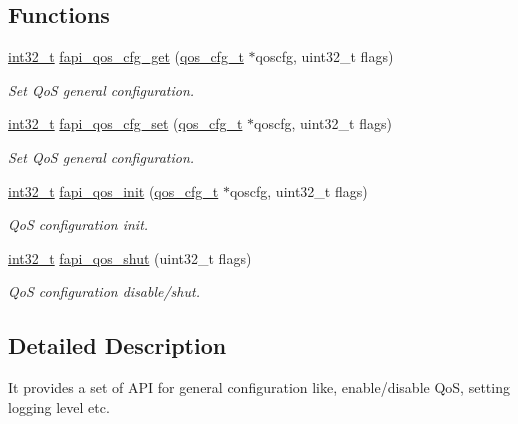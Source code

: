 \subsection*{Functions}
\begin{DoxyCompactItemize}
\item 
\hyperlink{commondefs_8h_a32f2e37ee053cf2ce8ca28d1f74630e5}{int32\-\_\-t} \hyperlink{group__FAPI__QOS__GENERAL_gafd940d9821b55eebebc562898643af6b}{fapi\-\_\-qos\-\_\-cfg\-\_\-get} (\hyperlink{group__FAPI__QOS__GENERAL_gabfc98fb0c7c5226badf1eb79b4ab6e2b}{qos\-\_\-cfg\-\_\-t} $\ast$qoscfg, uint32\-\_\-t flags)
\begin{DoxyCompactList}\small\item\em Set Qo\-S general configuration. \end{DoxyCompactList}\item 
\hyperlink{commondefs_8h_a32f2e37ee053cf2ce8ca28d1f74630e5}{int32\-\_\-t} \hyperlink{group__FAPI__QOS__GENERAL_ga2f04ba96cfa8c5cd6e4c648c777c6fbd}{fapi\-\_\-qos\-\_\-cfg\-\_\-set} (\hyperlink{group__FAPI__QOS__GENERAL_gabfc98fb0c7c5226badf1eb79b4ab6e2b}{qos\-\_\-cfg\-\_\-t} $\ast$qoscfg, uint32\-\_\-t flags)
\begin{DoxyCompactList}\small\item\em Set Qo\-S general configuration. \end{DoxyCompactList}\item 
\hyperlink{commondefs_8h_a32f2e37ee053cf2ce8ca28d1f74630e5}{int32\-\_\-t} \hyperlink{group__FAPI__QOS__GENERAL_ga9909b3559cf8dfbd0704a6e01ce7a9a6}{fapi\-\_\-qos\-\_\-init} (\hyperlink{group__FAPI__QOS__GENERAL_gabfc98fb0c7c5226badf1eb79b4ab6e2b}{qos\-\_\-cfg\-\_\-t} $\ast$qoscfg, uint32\-\_\-t flags)
\begin{DoxyCompactList}\small\item\em Qo\-S configuration init. \end{DoxyCompactList}\item 
\hyperlink{commondefs_8h_a32f2e37ee053cf2ce8ca28d1f74630e5}{int32\-\_\-t} \hyperlink{group__FAPI__QOS__GENERAL_ga77057b89e0678c0af7a7f21903af2b03}{fapi\-\_\-qos\-\_\-shut} (uint32\-\_\-t flags)
\begin{DoxyCompactList}\small\item\em Qo\-S configuration disable/shut. \end{DoxyCompactList}\end{DoxyCompactItemize}


\subsection{Detailed Description}
It provides a set of A\-P\-I for general configuration like, enable/disable Qo\-S, setting logging level etc. 

